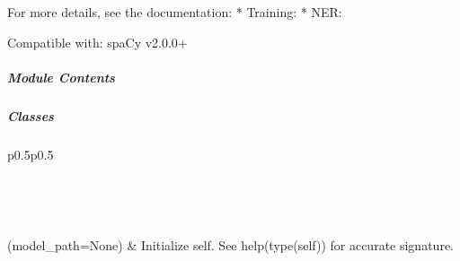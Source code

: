 \documentclass[letterpaper,10pt,english]{sphinxmanual}
\begin{document}
For more details, see the documentation:
* Training: 
* NER: 

Compatible with: spaCy v2.0.0+



\subparagraph{Module Contents}
\label{\detokenize{autoapi/pine/pipelines/spacy_NER_pipeline/index:module-contents}}

\subparagraph{Classes}
\label{\detokenize{autoapi/pine/pipelines/spacy_NER_pipeline/index:classes}}

\begin{savenotes}\sphinxatlongtablestart\begin{longtable}[c]{p{0.5\linewidth}p{0.5\linewidth}}
\hline

\endfirsthead

%
{}\\
\hline

\endhead

\hline
{}\\
\endfoot

\endlastfoot

{\hyperref[\detokenize{autoapi/pine/pipelines/spacy_NER_pipeline/index:pine.pipelines.spacy_NER_pipeline.spacy_NER}]{}}(model\_path=None)
&
Initialize self.  See help(type(self)) for accurate signature.
\\
\hline
\end{longtable}\sphinxatlongtableend\end{savenotes}
\end{document}
